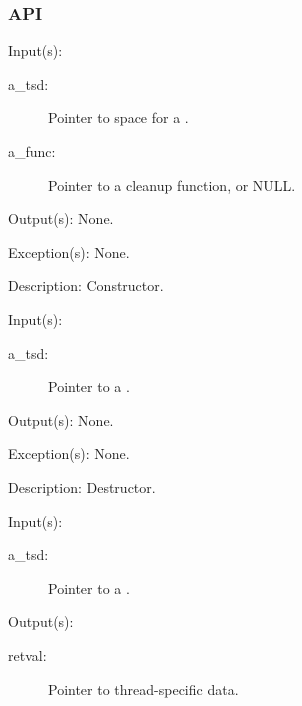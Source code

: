 \subsubsection{API}
\begin{capi}
\label{tsd_new}
	\begin{capilist}
	\item[Input(s): ]
		\begin{description}\item[]
		\item[a\_tsd: ]
			Pointer to space for a .
		\item[a\_func: ]
			Pointer to a cleanup function, or NULL.
		\end{description}
	\item[Output(s): ] None.
	\item[Exception(s): ] None.
	\item[Description: ]
		Constructor.
	\end{capilist}
\label{tsd_delete}
	\begin{capilist}
	\item[Input(s): ]
		\begin{description}\item[]
		\item[a\_tsd: ]
			Pointer to a \classname{tsd}.
		\end{description}
	\item[Output(s): ] None.
	\item[Exception(s): ] None.
	\item[Description: ]
		Destructor.
	\end{capilist}
\label{tsd_get}
	\begin{capilist}
	\item[Input(s): ]
		\begin{description}\item[]
		\item[a\_tsd: ]
			Pointer to a .
		\end{description}
	\item[Output(s): ]
		\begin{description}\item[]
		\item[retval: ]
			Pointer to thread-specific data.

\end{description}
\end{capilist}
\end{capi}
